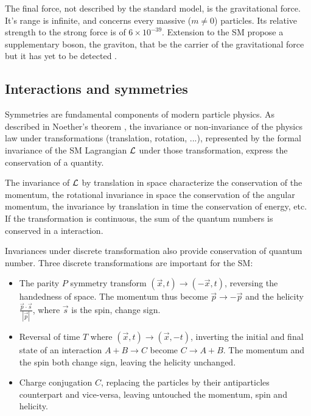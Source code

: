 The final force, not described by the standard model, is the gravitational force. It's range is infinite, and concerns every massive ($m \neq 0$) particles. Its relative strength to the strong force is of $6\times 10^{-39}$. Extension to the SM propose a supplementary boson, the graviton, that be the carrier of the gravitational force but it has yet to be detected \cite{ParticleDataGroup:2024cfk, carney_graviton_2024}.

\subsection{Interactions and symmetries}

Symmetries are fundamental components of modern particle physics. As described in Noether's theorem \cite{noether_invariant_1971}, the invariance or non-invariance of the physics law under transformations (translation, rotation, ...), represented by the formal invariance of the SM Lagrangian ${\cal L}$ under those transformation, express the conservation of a quantity.

The invariance of ${\cal L}$ by translation in space characterize the conservation of the momentum, the rotational invariance in space the conservation of the angular momentum, the invariance by translation in time the conservation of energy, etc. If the transformation is continuous, the sum of the quantum numbers is conserved in a interaction.

Invariances under discrete transformation also provide conservation of quantum number. Three discrete transformations are important for the SM:
\begin{itemize}
  \item The parity $P$ symmetry transform $(\vec{x}, t) \rightarrow (-\vec{x}, t)$, reversing the handedness of space. The momentum thus become $\vec{p} \rightarrow -\vec{p}$ and the helicity $\frac{\vec{p} \cdot \vec{s}}{|\vec{p}|}$, where $\vec{s}$ is the spin, change sign.

  \item Reversal of time $T$ where $(\vec{x}, t) \rightarrow (\vec{x}, -t)$, inverting the initial and final state of an interaction $A + B \rightarrow C$ become $C \rightarrow A + B$. The momentum and the spin both change sign, leaving the helicity unchanged.

  \item Charge conjugation $C$, replacing the particles by their antiparticles counterpart and vice-versa, leaving untouched the momentum, spin and helicity.
\end{itemize}

